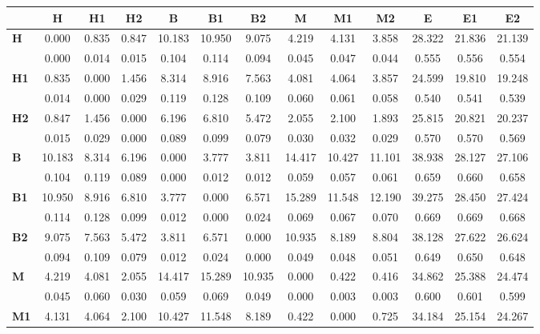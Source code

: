 \begin{table*}[h!]
\begin{center}
\begin{tabular}{| l || c | c | c || c | c | c || c | c | c || c | c | c |}\hline
 & {\bf H} & {\bf H1} & {\bf H2} & {\bf B} & {\bf B1} & {\bf B2} & {\bf M} & {\bf M1} & {\bf M2} & {\bf E} & {\bf E1} & {\bf E2} \\\hline\hline
{\bf H} & 0.000 & 0.835 & 0.847 & 10.183 & 10.950 & 9.075 & 4.219 & 4.131 & 3.858 & 28.322 & 21.836 & 21.139 \\
 & 0.000  & 0.014  & 0.015  & 0.104  & 0.114  & 0.094  & 0.045  & 0.047  & 0.044  & 0.555  & 0.556  & 0.554 \\\hline
{\bf H1} & 0.835 & 0.000 & 1.456 & 8.314 & 8.916 & 7.563 & 4.081 & 4.064 & 3.857 & 24.599 & 19.810 & 19.248 \\
 & 0.014  & 0.000  & 0.029  & 0.119  & 0.128  & 0.109  & 0.060  & 0.061  & 0.058  & 0.540  & 0.541  & 0.539 \\\hline
{\bf H2} & 0.847 & 1.456 & 0.000 & 6.196 & 6.810 & 5.472 & 2.055 & 2.100 & 1.893 & 25.815 & 20.821 & 20.237 \\
 & 0.015  & 0.029  & 0.000  & 0.089  & 0.099  & 0.079  & 0.030  & 0.032  & 0.029  & 0.570  & 0.570  & 0.569 \\\hline\hline
{\bf B} & 10.183 & 8.314 & 6.196 & 0.000 & 3.777 & 3.811 & 14.417 & 10.427 & 11.101 & 38.938 & 28.127 & 27.106 \\
 & 0.104  & 0.119  & 0.089  & 0.000  & 0.012  & 0.012  & 0.059  & 0.057  & 0.061  & 0.659  & 0.660  & 0.658 \\\hline
{\bf B1} & 10.950 & 8.916 & 6.810 & 3.777 & 0.000 & 6.571 & 15.289 & 11.548 & 12.190 & 39.275 & 28.450 & 27.424 \\
 & 0.114  & 0.128  & 0.099  & 0.012  & 0.000  & 0.024  & 0.069  & 0.067  & 0.070  & 0.669  & 0.669  & 0.668 \\\hline
{\bf B2} & 9.075 & 7.563 & 5.472 & 3.811 & 6.571 & 0.000 & 10.935 & 8.189 & 8.804 & 38.128 & 27.622 & 26.624 \\
 & 0.094  & 0.109  & 0.079  & 0.012  & 0.024  & 0.000  & 0.049  & 0.048  & 0.051  & 0.649  & 0.650  & 0.648 \\\hline\hline
{\bf M} & 4.219 & 4.081 & 2.055 & 14.417 & 15.289 & 10.935 & 0.000 & 0.422 & 0.416 & 34.862 & 25.388 & 24.474 \\
 & 0.045  & 0.060  & 0.030  & 0.059  & 0.069  & 0.049  & 0.000  & 0.003  & 0.003  & 0.600  & 0.601  & 0.599 \\\hline
{\bf M1} & 4.131 & 4.064 & 2.100 & 10.427 & 11.548 & 8.189 & 0.422 & 0.000 & 0.725 & 34.184 & 25.154 & 24.267 \\

\end{tabular}
\end{center}
\end{table*}

